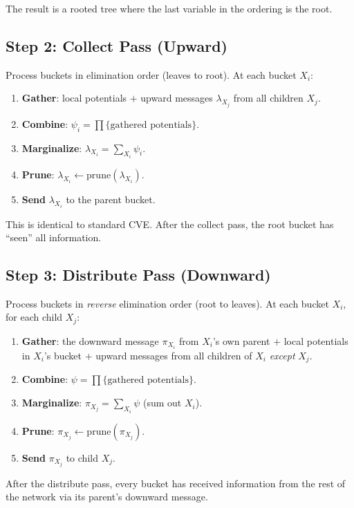 \documentclass[11pt]{article}
\begin{document}
The result is a rooted tree where the last variable in the ordering is the root.

\subsection{Step 2: Collect Pass (Upward)}

Process buckets in elimination order (leaves to root). At each bucket $X_i$:
\begin{enumerate}
  \item \textbf{Gather}: local potentials $+$ upward messages $\lambda_{X_j}$ from
        all children $X_j$.
  \item \textbf{Combine}: $\psi_i = \prod \{\text{gathered potentials}\}$.
  \item \textbf{Marginalize}: $\lambda_{X_i} = \sum_{X_i} \psi_i$.
  \item \textbf{Prune}: $\lambda_{X_i} \gets \mathrm{prune}(\lambda_{X_i})$.
  \item \textbf{Send} $\lambda_{X_i}$ to the parent bucket.
\end{enumerate}

This is identical to standard CVE. After the collect pass, the root bucket
has ``seen'' all information.

\subsection{Step 3: Distribute Pass (Downward)}

Process buckets in \emph{reverse} elimination order (root to leaves). At each
bucket $X_i$, for each child $X_j$:
\begin{enumerate}
  \item \textbf{Gather}: the downward message $\pi_{X_i}$ from $X_i$'s own parent
        $+$ local potentials in $X_i$'s bucket $+$ upward messages from all children
        of $X_i$ \emph{except} $X_j$.
  \item \textbf{Combine}: $\psi = \prod \{\text{gathered potentials}\}$.
  \item \textbf{Marginalize}: $\pi_{X_j} = \sum_{X_i} \psi$ (sum out $X_i$).
  \item \textbf{Prune}: $\pi_{X_j} \gets \mathrm{prune}(\pi_{X_j})$.
  \item \textbf{Send} $\pi_{X_j}$ to child $X_j$.
\end{enumerate}

After the distribute pass, every bucket has received information from the rest
of the network via its parent's downward message.
\end{document}
